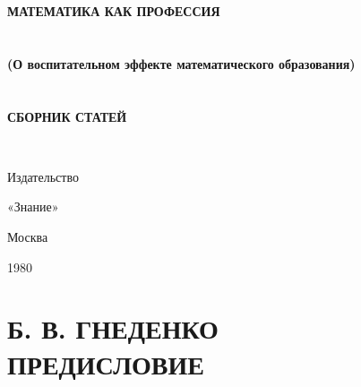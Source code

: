\documentclass[12pt, a4paper, openany]{book}
\begin{document}
	
	\begin{titlepage}
		
		\begin{center}
			\vspace*{\fill}
			
			

			{\Huge\bf МАТЕМАТИКА КАК ПРОФЕССИЯ\\}
			\ \\
			\ \\
			
			{\Huge\bf (О воспитательном эффекте математического образования)\\}
			\ \\
			\ \\
			{\large\bf СБОРНИК СТАТЕЙ\\}
			
			
			
			\ \\
			
			
			\vspace*{\fill}
			
			\vfill
			
			
Издательство

«Знание»

Москва
			
1980
			

		\end{center}
		
	\end{titlepage}
	
	\thispagestyle{empty} %
	
	\newpage
	

\setcounter{secnumdepth}{0}
	
	\section[\textls{Б. В. Гнеденко}. Предисловие]{{\small Б. В. ГНЕДЕНКО} \\ \textbf{ПРЕДИСЛОВИЕ}}
\end{document}
